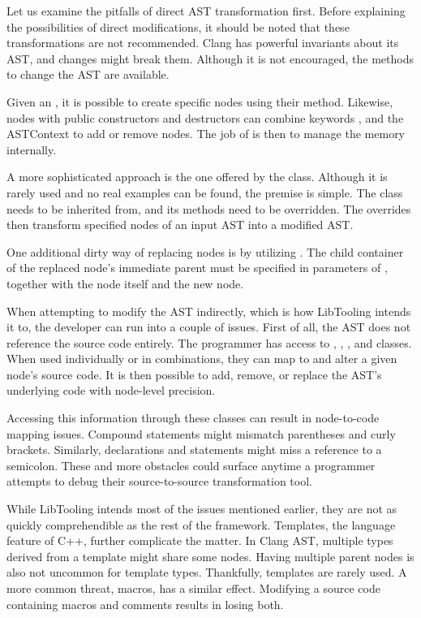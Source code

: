 Let us examine the pitfalls of direct AST transformation first. 
Before explaining the possibilities of direct modifications, it 
should be noted that these transformations are not recommended. 
Clang has powerful invariants about its AST, and changes might 
break them. 
Although it is not encouraged, the methods to change the AST 
are available.

Given an , it is possible to create specific nodes
using their  method. 
Likewise, nodes with public constructors and destructors can combine 
keywords ,  and the ASTContext 
to add or remove nodes. 
The job of  is then to manage the memory internally.

A more sophisticated approach is the one offered 
by the  class. 
Although it is rarely used and no real examples can be found, 
the premise is simple. 
The  class needs to be inherited from, 
and its  methods need to be overridden. 
The overrides then transform specified nodes of an input AST 
into a modified AST.

One additional dirty way of replacing nodes is by utilizing 
. 
The child container of the replaced node's immediate parent must be 
specified in parameters of , together with 
the node itself and the new node.


When attempting to modify the AST indirectly, which is how LibTooling 
intends it to, the developer can run into a couple of issues. 
First of all, the AST does not reference the source code entirely. 
The programmer has access to , ,
, and  classes. 
When used individually or in combinations, they can map to and alter 
a given node's source code.
It is then possible to add, remove, or replace the AST's underlying 
code with node-level precision.

Accessing this information through these classes can result in 
node-to-code mapping issues. 
Compound statements might mismatch parentheses and curly brackets. 
Similarly, declarations and statements might miss a reference to 
a semicolon. 
These and more obstacles could surface anytime a programmer attempts 
to debug their source-to-source transformation tool. 

While LibTooling intends most of the issues mentioned earlier, 
they are not as quickly comprehendible as the rest of the framework. 
Templates, the language feature of C++, further complicate the matter. 
In Clang AST, multiple types derived from a template might share some nodes. 
Having multiple parent nodes is also not uncommon for template types. 
Thankfully, templates are rarely used. 
A more common threat, macros, has a similar effect. 
Modifying a source code containing macros and comments results in 
losing both.
